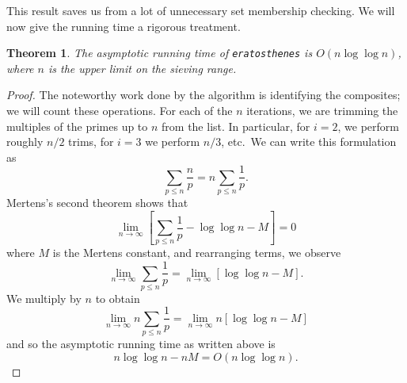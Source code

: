 \documentclass{amsart}
\newtheorem{thm}{Theorem}
\theoremstyle{definition}
\theoremstyle{case}
\begin{document}
	This result saves us from a lot of unnecessary set membership checking. We will now give the running time a rigorous treatment.
	
	\begin{thm}
		The asymptotic running time of \texttt{eratosthenes} is $O(n\log\log n)$, where $n$ is the upper limit on the sieving range.
	\end{thm}
	\begin{proof}
		The noteworthy work done by the algorithm is identifying the composites; we will count these operations. For each of the $n$ iterations, we are trimming the multiples of the primes up to $n$ from the list. In particular, for $i=2$, we perform roughly $n/2$ trims, for $i=3$ we perform $n/3$, etc.\ We can write this formulation as
		$$ \sum_{p\leq n} \frac{n}{p} = n \sum_{p \leq n} \frac{1}{p} . $$
		Mertens's second theorem shows that
		$$ \lim\limits_{n\rightarrow\infty} \left[ \sum_{p \leq n} \frac{1}{p} - \log\log n - M \right] = 0 $$
		where $M$ is the Mertens constant, and rearranging terms, we observe
		$$ \lim\limits_{n\rightarrow\infty} \sum_{p \leq n} \frac{1}{p} = \lim\limits_{n\rightarrow\infty} \left[ \log\log n - M \right] . $$
		We multiply by $n$ to obtain
		$$ \lim\limits_{n\rightarrow\infty} n \sum_{p \leq n} \frac{1}{p} = \lim\limits_{n\rightarrow\infty} n \left[ \log\log n - M \right] $$
		and so the asymptotic running time as written above is
		$$ n \log \log n - nM = O(n\log\log n). $$
	\end{proof}
	
\end{document}
